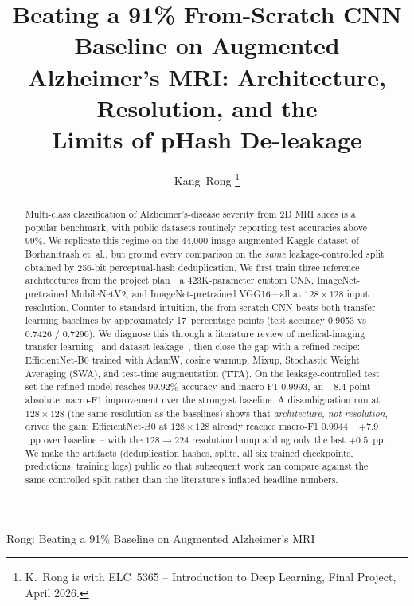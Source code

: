 \documentclass[journal,onecolumn,11pt]{IEEEtran}
\begin{document}
\title{Beating a 91\% From-Scratch CNN Baseline on Augmented \\
       Alzheimer's MRI: Architecture, Resolution, and the \\
       Limits of pHash De-leakage}

\author{Kang~Rong%
\thanks{K.~Rong is with ELC~5365 -- Introduction to Deep Learning,
        Final Project, April 2026.}}

%
{Rong: Beating a 91\% Baseline on Augmented Alzheimer's MRI}

\maketitle

\begin{abstract}
Multi-class classification of Alzheimer's-disease severity from 2D MRI slices
is a popular benchmark, with public datasets routinely reporting test
accuracies above 99\%. We replicate this regime on the 44{,}000-image
augmented Kaggle dataset of Borhanitrash et~al., but ground every comparison
on the \emph{same} leakage-controlled split obtained by 256-bit perceptual-hash
deduplication. We first train three reference architectures from the project
plan---a 423K-parameter custom CNN, ImageNet-pretrained MobileNetV2, and
ImageNet-pretrained VGG16---all at $128{\times}128$ input resolution. Counter
to standard intuition, the from-scratch CNN beats both transfer-learning
baselines by approximately 17~percentage points (test accuracy 0.9053 vs
0.7426 / 0.7290). We diagnose this through a literature review of
medical-imaging transfer learning~\cite{raghu2019transfusion} and dataset
leakage~\cite{yagis2021leakage,wen2020adcnn,young2025leakage}, then close
the gap with a refined recipe: EfficientNet-B0 trained with AdamW, cosine
warmup, Mixup, Stochastic Weight Averaging (SWA), and test-time augmentation
(TTA). On the leakage-controlled test set the refined model reaches
$99.92\%$ accuracy and macro-F1 $0.9993$, an $+8.4$-point absolute
macro-F1 improvement over the strongest baseline. A disambiguation run at
$128{\times}128$ (the same resolution as the baselines) shows that
\emph{architecture, not resolution}, drives the gain: EfficientNet-B0 at
$128{\times}128$ already reaches macro-F1 $0.9944$ -- $+7.9$~pp over
baseline -- with the $128\to224$ resolution bump adding only the last
$+0.5$~pp. We make the artifacts (deduplication hashes, splits, all six
trained checkpoints, predictions, training logs) public so that subsequent
work can compare against the same controlled split rather than the
literature's inflated headline numbers.
\end{abstract}
\end{document}
